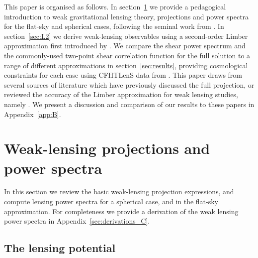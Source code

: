 \documentclass[fleqn,usenatbib]{mnras} %
\begin{document}
This paper is organised as follows.  In section~\ref{sec:wl} we provide a
pedagogical introduction to weak gravitational lensing theory, projections and
power spectra for the flat-sky and spherical cases, following the seminal work
from \citet{2000PhRvD..62d3007H} \cite[see also][]{2005PhRvD..72b3516C}. In
section~\ref{sec:L2} we derive weak-lensing observables using a second-order
Limber approximation first introduced by \citet{2008PhRvD..78l3506L}. We
compare the shear power spectrum and the commonly-used two-point shear
correlation function for the full solution to a range of different
approximations in section~\ref{sec:results}, providing cosmological constraints
for each case using CFHTLenS data from \citet{CFHTLenS-2pt-notomo}. This paper
draws from several sources of literature which have previously discussed the
full projection, or reviewed the accuracy of the Limber approximation for weak
lensing studies, namely \citet{2008PhRvD..78d3002S,2012PhRvD..86b3001B,
2012MNRAS.422.2854G, 2016arXiv161104954K}. We present a discussion and
comparison of our results to these papers in Appendix~\ref{app:B}.


\section{Weak-lensing projections and power spectra}
\label{sec:wl}

In this section we review the basic weak-lensing projection expressions, and
compute lensing power spectra for a spherical case, and in the flat-sky
approximation. For completeness we provide a derivation of the weak lensing
power spectra in Appendix~\ref{sec:derivations_C}.

\subsection{The lensing potential}
\label{sec:psi}
\end{document}
